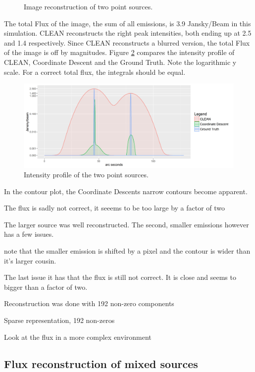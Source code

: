\begin{figure}[h]
	\caption{Image reconstruction of two point sources.}
	\label{results:points}
\end{figure}

The total Flux of the image, the sum of all emissions, is 3.9 Jansky/Beam in this simulation. CLEAN reconstructs the right peak intensities, both ending up at 2.5 and 1.4 respectively. Since CLEAN reconstructs a blurred version, the total Flux of the image is off by magnitudes. Figure \ref{results:points:contour} compares the intensity profile of CLEAN, Coordinate Descent and the Ground Truth. Note the logarithmic y scale. For a correct total flux, the integrals should be equal. 

\begin{figure}[h]
	\centering
	\includegraphics[width=0.8\linewidth]{./chapters/20.results/points/contour_points.png}
	\caption{Intensity profile of the two point sources.}
	\label{results:points:contour}
\end{figure}

In the contour plot, the Coordinate Descents narrow contours become apparent.

The flux is sadly not correct, it seeems to be too large by a factor of two

The larger source was well reconstructed. The second, smaller emissions however has a few issues.

note that the smaller emission is shifted by a pixel and the contour is wider than it's larger cousin. 

The last issue it has that the flux is still not correct. It is close and seems to bigger than a factor of two.

Reconstruction was done with 192 non-zero components

Sparse representation, 192 non-zeros


Look at the flux in a more complex environment


\subsection{Flux reconstruction of mixed sources}

